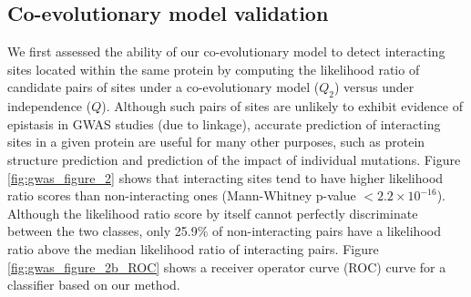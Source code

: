 \subsection{Co-evolutionary model validation}

We first assessed the ability of our co-evolutionary model to detect interacting sites located within the same protein by computing the likelihood ratio of candidate pairs of sites under a co-evolutionary model ($Q_2$) versus under independence ($Q$). 
Although such pairs of sites are unlikely to exhibit evidence of epistasis in GWAS studies (due to linkage), accurate prediction of interacting sites in a given protein are useful for many other purposes, such as protein structure prediction and prediction of the impact of individual mutations.  
Figure \ref{fig:gwas_figure_2} shows that interacting sites tend to have higher likelihood ratio scores than non-interacting ones (Mann-Whitney p-value $< 2.2 \times 10^{-16}$). 
Although the likelihood ratio score by itself cannot perfectly discriminate between the two classes, only 25.9\% of non-interacting pairs have a likelihood ratio above the median likelihood ratio of interacting pairs. 
Figure \ref{fig:gwas_figure_2b_ROC} shows a receiver operator curve (ROC) curve for a classifier based on our method.



